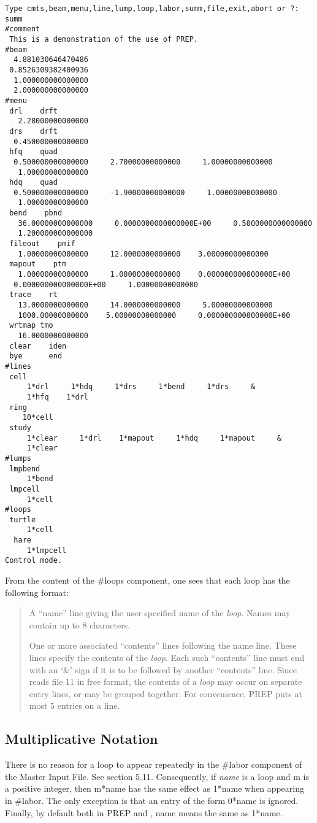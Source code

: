 \begin{footnotesize}
\begin{verbatim}
Type cmts,beam,menu,line,lump,loop,labor,summ,file,exit,abort or ?:
summ
#comment
 This is a demonstration of the use of PREP.
#beam
  4.881030646470486
 0.8526309382400936
  1.000000000000000
  2.000000000000000
#menu
 drl    drft
   2.28000000000000
 drs    drft
  0.450000000000000
 hfq    quad
  0.500000000000000     2.70000000000000     1.00000000000000
   1.00000000000000
 hdq    quad
  0.500000000000000     -1.90000000000000     1.00000000000000
   1.00000000000000
 bend    pbnd
   36.00000000000000     0.0000000000000000E+00     0.5000000000000000
   1.200000000000000
 fileout    pmif
   1.00000000000000     12.0000000000000    3.00000000000000
 mapout    ptm
   1.00000000000000     1.00000000000000    0.000000000000000E+00
  0.000000000000000E+00     1.00000000000000
 trace    rt
   13.0000000000000     14.0000000000000     5.00000000000000
   1000.00000000000    5.00000000000000     0.000000000000000E+00
 wrtmap tmo
   16.0000000000000
 clear    iden
 bye      end
#lines
 cell
     1*drl     1*hdq     1*drs     1*bend     1*drs     &
     1*hfq    1*drl
 ring
    10*cell
 study
     1*clear     1*drl    1*mapout     1*hdq     1*mapout     &
     1*clear
#lumps
 lmpbend
     1*bend
 lmpcell
     1*cell
#loops
 turtle
     1*cell
  hare
     1*lmpcell
Control mode.
\end{verbatim}
\end{footnotesize} From the content of the \#loops component, one sees that
each loop has the following format:
\begin{quotation} A ``name'' line giving the user specified name of the
{\em loop}. Names may contain up to 8 characters.

One or more associated ``contents'' lines following the name line. These
lines specify the contents of the {\em loop}. Each such ``contents'' line
must end with an `\&' sign if it is to be followed by another ``contents''
line. Since \Mary reads file 11 in free format, the contents of a {\em
loop} may occur on separate entry lines, or may be grouped together. For
convenience, PREP puts at most 5 entries on a line.
\end{quotation}

\subsection{Multiplicative Notation} There is no reason for a loop to
appear repeatedly in the \#labor component of the Master Input File. See
section 5.11. Consequently, if {\em name} is a loop and m is a positive
integer, then m*name has the same effect as 1*name when appearing in
\#labor. The only exception is that an entry of the form 0*name is ignored.
Finally, by default both in PREP and \Mary, name means the same as 1*name.


